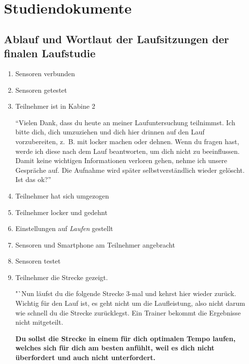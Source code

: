 

\chapter{Studiendokumente} 

\label{cha:studiendokumente}

\section{Ablauf und Wortlaut der Laufsitzungen der finalen Laufstudie} 

\label{sec:ablauf_und_wortlaut_der_laufsitzungen_der_finalen_laufstudie} 
\begin{enumerate}
	\item Sensoren verbunden 
	\item Sensoren getestet 
	\item Teilnehmer ist in Kabine 2
	
	"`Vielen Dank, dass du heute an meiner Laufuntersuchung teilnimmst. Ich bitte dich, dich umzuziehen und dich hier drinnen auf den Lauf vorzubereiten, z.~B. mit locker machen oder dehnen. Wenn du fragen hast, werde ich diese nach dem Lauf beantworten, um dich nicht zu beeinflussen. Damit keine wichtigen Informationen verloren gehen, nehme ich unsere Gespräche auf. Die Aufnahme wird später selbstverständlich wieder gelöscht. Ist das ok?"'
	
	\item Teilnehmer hat sich umgezogen 
	\item Teilnehmer locker und gedehnt
	
	\item Einstellungen auf \emph{Laufen} gestellt 
	\item Sensoren und Smartphone am Teilnehmer angebracht 
	\item Sensoren testet 
	\item Teilnehmer die Strecke gezeigt. 
	
	"`Nun läufst du die folgende Strecke 3-mal und kehrst hier wieder zurück. Wichtig für den Lauf ist, es geht nicht um die Laufleistung, also nicht darum wie schnell du die Strecke zurücklegst. Ein Trainer bekommt die Ergebnisse nicht mitgeteilt. 
	
	\textbf{Du sollst die Strecke in einem für dich optimalen Tempo laufen, welches sich für dich am besten anfühlt, weil es dich nicht überfordert und auch nicht unterfordert.}
	

\end{enumerate}
